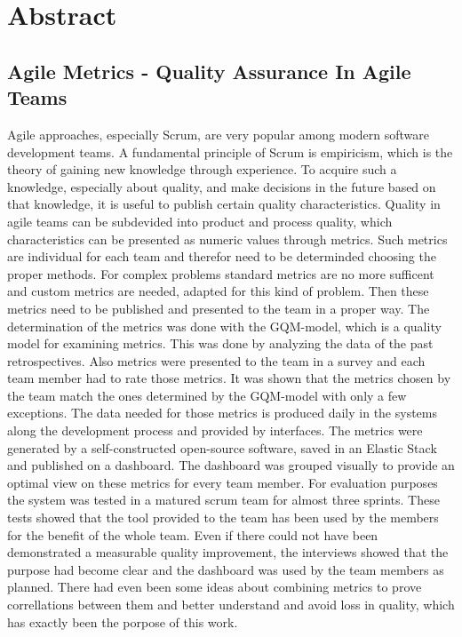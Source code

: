 \newpage
\chapter*{Abstract}
\section*{Agile Metrics {-} Quality Assurance In Agile Teams}

Agile approaches, especially Scrum, are very popular among modern software development teams.
A fundamental principle of Scrum is empiricism, which is the theory of gaining new knowledge through experience.
To acquire such a knowledge, especially about quality, and make decisions in the future based on that knowledge, it is useful to publish certain quality characteristics.
Quality in agile teams can be subdevided into product and process quality, which characteristics can be presented as numeric values through metrics.
Such metrics are individual for each team and therefor need to be determinded choosing the proper methods.
For complex problems standard metrics are no more sufficent and custom metrics are needed, adapted for this kind of problem.
Then these metrics need to be published and presented to the team in a proper way.
The determination of the metrics was done with the \ac{GQM}-model, which is a quality model for examining metrics.
This was done by analyzing the data of the past retrospectives.
Also metrics were presented to the team in a survey and each team member had to rate those metrics.
It was shown that the metrics chosen by the team match the ones determined by the \ac{GQM}-model with only a few exceptions.
The data needed for those metrics is produced daily in the systems along the development process and provided by interfaces.
The metrics were generated by a self-constructed open-source software, saved in an Elastic Stack and published on a dashboard.
The dashboard was grouped visually to provide an optimal view on these metrics for every team member.
For evaluation purposes the system was tested in a matured scrum team for almost three sprints.
These tests showed that the tool provided to the team has been used by the members for the benefit of the whole team.
Even if there could not have been demonstrated a measurable quality improvement, the interviews showed that the purpose had become clear and the dashboard was used by the team members as planned.
There had even been some ideas about combining metrics to prove correllations between them and better understand and avoid loss in quality, which has exactly been the porpose of this work.
